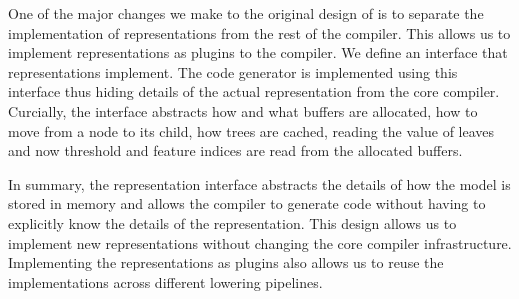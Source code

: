 One of the major changes we make to the original design of \TreebeardOLD{} \cite{Treebeard} is to
separate the implementation of representations from the rest of the compiler. This allows
us to implement representations as plugins to the compiler. We define an interface 
that representations implement. The code generator is implemented using
this interface thus hiding details of the actual representation from the core 
compiler. Curcially, the interface abstracts how and what buffers 
are allocated, how to move from a node to its child, how trees 
are cached, reading the value of leaves and now threshold and 
feature indices are read from the allocated buffers.

In summary, the representation interface abstracts the details of how the model is stored in memory
and allows the compiler to generate code without having to explicitly know the details of the
representation. This design allows us to implement new representations without changing the core
compiler infrastructure. Implementing the representations as plugins also allows us to reuse
the implementations across different lowering pipelines. 


